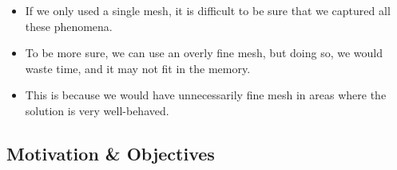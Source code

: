 \documentclass{beamer}
\begin{document}
\begin{frame}
\vspace{-3mm} 
\begin{itemize}
\item If we only used a single mesh, it is difficult to be sure that we captured all these phenomena.
\item \vspace{-3mm} To be more sure, we can use an overly fine mesh, but doing so, we would waste time, and it may not fit in the memory.
\item \vspace{-3mm} This is because we would have unnecessarily fine mesh in areas where the solution is very well-behaved.
\end{itemize}

\end{frame}

\subsection{Motivation \& Objectives}
\end{document}
